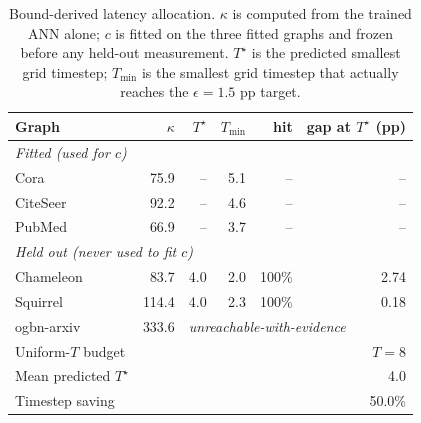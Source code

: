 \begin{table}[t]
\centering
\small
\caption{Bound-derived latency allocation. $\kappa$ is computed from the trained
ANN alone; $c$ is fitted on the three fitted graphs and frozen before any held-out
measurement. $T^\star$ is the predicted smallest grid timestep; $T_{\min}$ is the
smallest grid timestep that actually reaches the $\epsilon{=}1.5$ pp target.}
\label{tab:c3}
\begin{tabular}{lrrrrr}
\toprule
Graph & $\kappa$ & $T^\star$ & $T_{\min}$ & hit & gap at $T^\star$ (pp) \\
\midrule
\multicolumn{6}{l}{\emph{Fitted (used for $c$)}} \\
Cora & 75.9 & -- & 5.1 & -- & -- \\
CiteSeer & 92.2 & -- & 4.6 & -- & -- \\
PubMed & 66.9 & -- & 3.7 & -- & -- \\
\midrule
\multicolumn{6}{l}{\emph{Held out (never used to fit $c$)}} \\
Chameleon & 83.7 & 4.0 & 2.0 & 100\% & 2.74 \\
Squirrel & 114.4 & 4.0 & 2.3 & 100\% & 0.18 \\
ogbn-arxiv & 333.6 & \multicolumn{4}{l}{\emph{unreachable-with-evidence}} \\
\midrule
Uniform-$T$ budget & \multicolumn{5}{r}{$T{=}8$} \\
Mean predicted $T^\star$ & \multicolumn{5}{r}{4.0} \\
Timestep saving & \multicolumn{5}{r}{50.0\%} \\
\bottomrule
\end{tabular}
\end{table}
